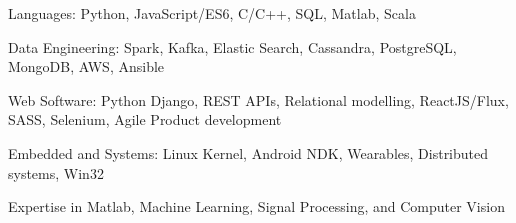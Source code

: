
\begin{cventries}

\vspace{-5mm}

  \cventry
    {}
    {}
    {}
    {}
    {
      \begin{cvitems} %
	    \item {Languages: Python, JavaScript/ES6, C/C++, SQL, Matlab, Scala}
		\item {Data Engineering: Spark, Kafka, Elastic Search, Cassandra, PostgreSQL, MongoDB, AWS, Ansible}
		\item {Web Software: Python Django, REST APIs, Relational modelling, ReactJS/Flux, SASS, Selenium, Agile Product development}
        \item {Embedded and Systems: Linux Kernel, Android NDK, Wearables, Distributed systems, Win32}
        \item {Expertise in Matlab, Machine Learning, Signal Processing, and Computer Vision}
      \end{cvitems}
    }

\end{cventries}